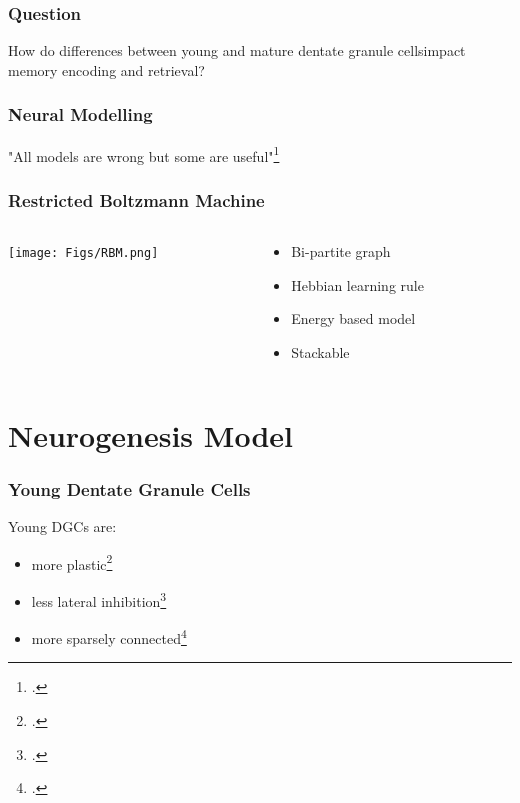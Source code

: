 \documentclass{beamer}
\begin{document}
\begin{frame}
\frametitle{Question}
How do differences between young and mature dentate granule cells\newline impact memory encoding and retrieval?
\end{frame}

\begin{frame}
\frametitle{Neural Modelling}
\center
"All models are wrong but some are useful"\footcite{box-87}
\end{frame}

\begin{frame}
\frametitle{Restricted Boltzmann Machine}
\begin{columns}[T] %
\begin{column}[T]{.49\linewidth} %
\texttt{[image: Figs/RBM.png]}
\end{column}
\begin{column}[T]{.49\linewidth} %
\begin{itemize}
\item Bi-partite graph
\item Hebbian learning rule
\item Energy based model
\item Stackable
\end{itemize}
\end{column}
\end{columns}
\end{frame}

\section{Neurogenesis Model}

\begin{frame}
\frametitle{Young Dentate Granule Cells}
Young \ac{DGC}s are:
\begin{itemize}
\item more plastic\footcite{enhanced_synaptic_plasticity}
\item less lateral inhibition\footcite{marin-burgin-et-al-12}
\item more sparsely connected\footcite{wang-et-al-00}
\end{itemize}
\end{frame}
\end{document}
